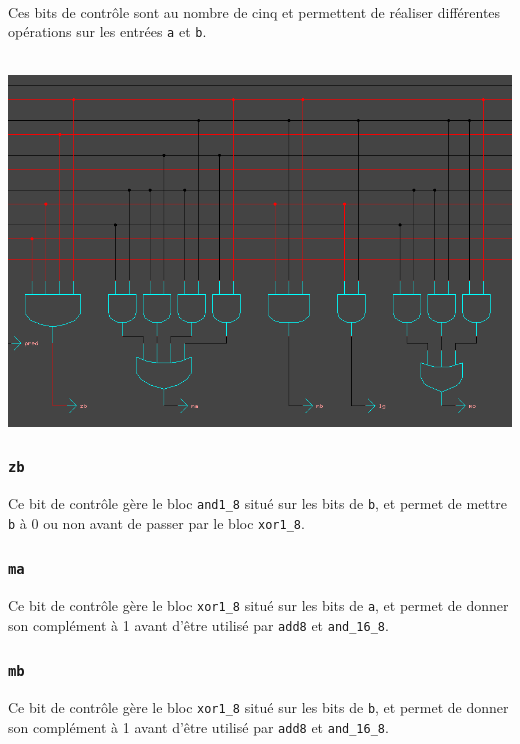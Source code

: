 \documentclass[11pt, a4paper, twoside, titlepage]{article}
\begin{document}
\paragraph{}
Ces bits de contrôle sont au nombre de cinq et permettent de réaliser différentes opérations sur les entrées \texttt{a} et \texttt{b}.\\
\\
\centerline{\includegraphics[width=.8 \textwidth]{log_alu}}
\paragraph{}
\subsubsection{\texttt{zb}}
Ce bit de contrôle gère le bloc \texttt{and1\_8} situé sur les bits de \texttt{b}, et permet de mettre \texttt{b} à 0 ou non avant de passer par le bloc \texttt{xor1\_8}.

\subsubsection{\texttt{ma}}
Ce bit de contrôle gère le bloc \texttt{xor1\_8} situé sur les bits de \texttt{a}, et permet de donner son complément à 1 avant d'être utilisé par \texttt{add8} et \texttt{and\_16\_8}.

\subsubsection{\texttt{mb}}
Ce bit de contrôle gère le bloc \texttt{xor1\_8} situé sur les bits de \texttt{b}, et permet de donner son complément à 1 avant d'être utilisé par \texttt{add8} et \texttt{and\_16\_8}.
\end{document}
